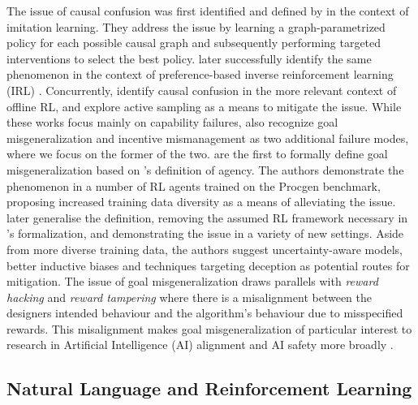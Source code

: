 \documentclass[../thesis-proposal/main.tex]{subfiles}
\begin{document}
The issue of causal confusion was first identified and defined by \citet{de_haan_causal_2019} in the
context of imitation learning. They address the issue by learning a graph-parametrized policy for
each possible causal graph and subsequently performing targeted interventions to select the best
policy.  later successfully identify the same phenomenon in the context of
preference-based \citep{christiano_deep_2017} inverse reinforcement learning (IRL)
\citep{ng_algorithms_2000}. Concurrently, \citet{gupta_can_2022} identify causal confusion in the
more relevant context of offline RL, and explore active sampling as a means to mitigate the issue.
While these works focus mainly on capability failures, \citet{kirk_causal_2022} also recognize goal
misgeneralization and incentive mismanagement \citep{farquhar_path-specific_2022} as two additional
failure modes, where we focus on the former of the two.  are the first to
formally define goal misgeneralization based on \citet{orseau_agents_2018}'s definition of agency.
The authors demonstrate the phenomenon in a number of RL agents trained on the Procgen
\citep{cobbe_leveraging_2020} benchmark, proposing increased training data diversity as a means of
alleviating the issue.  later generalise the definition, removing the assumed
RL framework necessary in \citet{langosco_goal_2022}'s formalization, and demonstrating the issue in
a variety of new settings. Aside from more diverse training data, the authors suggest
uncertainty-aware models, better inductive biases and techniques targeting deception as potential
routes for mitigation. The issue of goal misgeneralization draws parallels with \textit{reward
hacking} \citep{pan_effects_2022, skalse_defining_2022} and \textit{reward tampering}
\citep{everitt_reward_2021} where there is a misalignment between the designers intended behaviour
and the algorithm's behaviour due to misspecified rewards. This misalignment makes goal
misgeneralization of particular interest to research in Artificial Intelligence (AI) alignment
\citep{ngo_alignment_2022} and AI safety more broadly \citep{hendrycks_unsolved_2022,
houben_inspect_2022}.

\subsection{Natural Language and Reinforcement Learning} 
\end{document}
